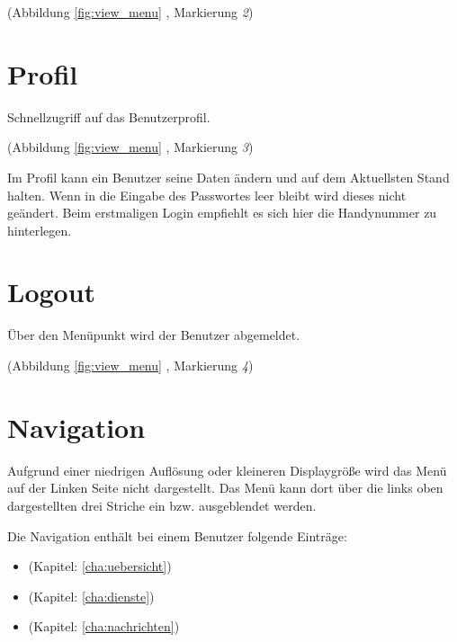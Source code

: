 \noindent (Abbildung \ref{fig:view_menu} \textit{}, Markierung \textit{2})

\section{Profil}
\label{sec:menu_profile}
Schnellzugriff auf das Benutzerprofil.

\noindent (Abbildung \ref{fig:view_menu} \textit{}, Markierung \textit{3})

\noindent Im Profil kann ein Benutzer seine Daten ändern und auf dem Aktuellsten Stand halten. Wenn in die Eingabe des Passwortes leer bleibt wird dieses nicht geändert. Beim erstmaligen Login empfiehlt es sich hier die Handynummer zu hinterlegen.  

\section{Logout}
\label{sec:menu_logout}
Über den Menüpunkt wird der Benutzer abgemeldet.

\noindent (Abbildung \ref{fig:view_menu} \textit{}, Markierung \textit{4})

\section{Navigation}
\label{sec:menu_navigation}
Aufgrund einer niedrigen Auflösung oder kleineren Displaygröße wird das Menü auf der Linken Seite nicht dargestellt. Das Menü kann dort über die links oben dargestellten drei Striche ein bzw. ausgeblendet werden.

\noindent Die Navigation enthält bei einem Benutzer folgende Einträge: 
\begin{itemize}
\item {} (Kapitel: \ref{cha:uebersicht})
\item {} (Kapitel: \ref{cha:dienste})
\item {} (Kapitel: \ref{cha:nachrichten})
\end{itemize}